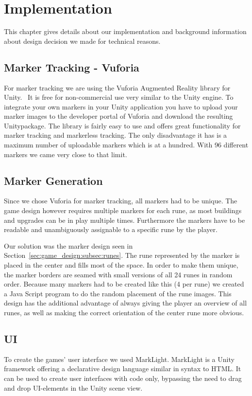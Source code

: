 \section{Implementation}
This chapter gives details about our implementation and background information about design decision we made for technical reasons.

\subsection{Marker Tracking - Vuforia}

For marker tracking we are using the Vuforia Augmented Reality library for Unity.~\cite{vuforia} It is free for non-commercial use very similar to the Unity engine. To integrate your own markers in your Unity application you have to upload your marker images to the developer portal of Vuforia and download the resulting Unitypackage. 
The library is fairly easy to use and offers great functionality for marker tracking and markerless tracking. The only disadvantage it has is a maximum number of uploadable markers which is at a hundred. With 96 different markers we came very close to that limit.

\subsection{Marker Generation}
Since we chose Vuforia for marker tracking, all markers had to be unique. The game design however requires multiple markers for each rune, as most buildings and upgrades can be in play multiple times. Furthermore the markers have to be readable and unambiguously assignable to a specific rune by the player.

Our solution was the marker design seen in Section~\ref{sec:game_design:subsec:runes}. The rune represented by the marker is placed in the center and fills most of the space. In order to make them unique, the marker borders are seamed with small versions of all 24 runes in random order. Because many markers had to be created like this (4 per rune) we created a Java Script program to do the random placement of the rune images. This design has the additional advantage of always giving the player an overview of all runes, as well as making the correct orientation of the center rune more obvious.

\subsection{UI}
To create the games' user interface we used MarkLight.\cite{marklight} MarkLight is a Unity framework offering a declarative design language similar in syntax to HTML. It can be used to create user interfaces with code only, bypassing the need to drag and drop UI-elements in the Unity scene view.


